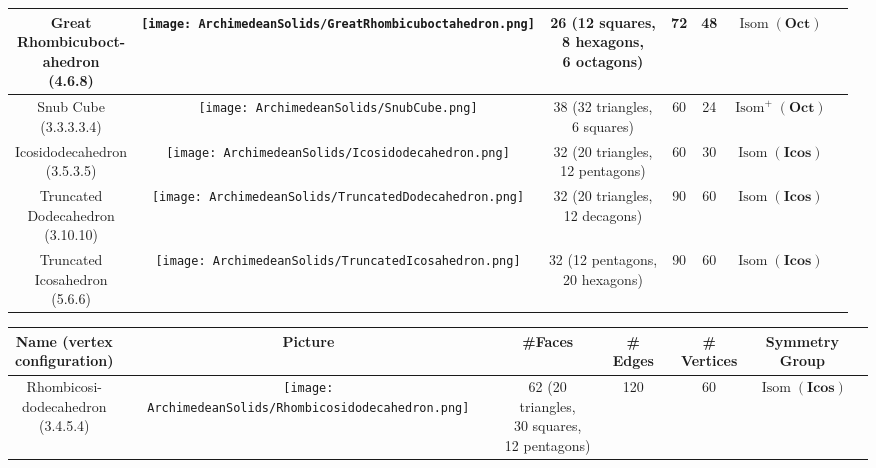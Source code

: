 \documentclass[leqno]{book}
\begin{document}
\begin{center}
\begin{tabular}{ccccccc}
\parbox{2.5cm}{Great\\Rhombicuboct-\\ahedron\\(4.6.8)}&
\texttt{[image: ArchimedeanSolids/GreatRhombicuboctahedron.png]}&
26 \parbox{2cm}{(12 squares,\\8 hexagons,\\6 octagons)}&
72&
48&
$\operatorname{Isom}(\mathbf{Oct})$\\\hline

\parbox{2.5cm}{Snub Cube\\(3.3.3.3.4)}&
\texttt{[image: ArchimedeanSolids/SnubCube.png]}&
38 \parbox{2cm}{(32 triangles,\\6 squares)}&
60&
24&
$\operatorname{Isom}^+(\mathbf{Oct})$\\\hline

\parbox{2.5cm}{Icosidodecahedron\\(3.5.3.5)}&
\texttt{[image: ArchimedeanSolids/Icosidodecahedron.png]}&
32 \parbox{2.2cm}{(20 triangles,\\12 pentagons)}&
60&
30&
$\operatorname{Isom}(\mathbf{Icos})$\\\hline

\parbox{2.5cm}{Truncated\\Dodecahedron\\(3.10.10)}&
\texttt{[image: ArchimedeanSolids/TruncatedDodecahedron.png]}&
32 \parbox{2cm}{(20 triangles,\\12 decagons)}&
90&
60&
$\operatorname{Isom}(\mathbf{Icos})$\\\hline

\parbox{2.5cm}{Truncated\\Icosahedron\\(5.6.6)}&
\texttt{[image: ArchimedeanSolids/TruncatedIcosahedron.png]}&
32 \parbox{2.3cm}{(12 pentagons,\\20 hexagons)}&
90&
60&
$\operatorname{Isom}(\mathbf{Icos})$\\\hline
\end{tabular}

\begin{tabular}{ccccccc}
\parbox{2.5cm}{Name (vertex\\configuration)}&Picture&\#Faces&\# Edges&\# Vertices&\parbox{2cm}{Symmetry\\Group}\\\hline\hline

\parbox{2.5cm}{Rhombicosi-\\dodecahedron\\(3.4.5.4)}&
\texttt{[image: ArchimedeanSolids/Rhombicosidodecahedron.png]}&
62 \parbox{2.2cm}{(20 triangles,\\30 squares,\\12 pentagons)}&
120&
60&
$\operatorname{Isom}(\mathbf{Icos})$\\\hline


\end{tabular}
\end{center}
\end{document}
